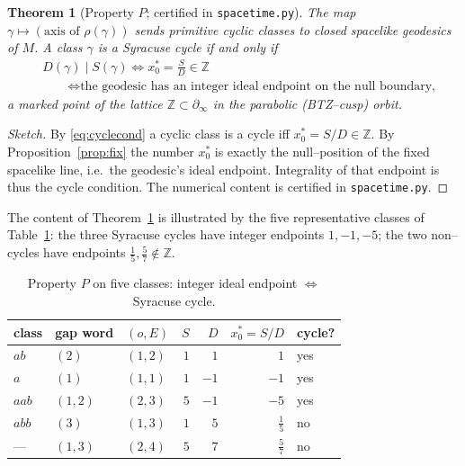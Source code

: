 \documentclass[11pt,a4paper]{article}
\theoremstyle{bourbaki}
\newtheorem{thm}{Theorem}[section]
\theoremstyle{bourbakidef}
\newcommand{\Z}{\mathbb{Z}}
\begin{document}
\begin{thm}[Property $P$; certified in \texttt{spacetime.py}]\label{thm:P}
The map $\gamma\mapsto(\text{axis of }\rho(\gamma))$ sends primitive cyclic classes to
closed spacelike geodesics of $M$. A class $\gamma$ is a \emph{Syracuse cycle} if and only if
\begin{align*}
  & D(\gamma)\mid S(\gamma)\iff x_0^\ast=\tfrac{S}{D}\in\Z\\
  &\qquad\iff \text{the geodesic has an integer ideal endpoint on the null boundary,}
\end{align*}
a marked point of the lattice $\Z\subset\partial_\infty$ in the parabolic (BTZ--cusp) orbit.
\end{thm}

\begin{proof}[Sketch]
By \eqref{eq:cyclecond} a cyclic class is a cycle iff $x_0^\ast=S/D\in\Z$. By
Proposition~\ref{prop:fix} the number $x_0^\ast$ is exactly the null--position of the fixed
spacelike line, i.e.\ the geodesic's ideal endpoint. Integrality of that endpoint is thus the
cycle condition. The numerical content is certified in \texttt{spacetime.py}.
\end{proof}

The content of Theorem~\ref{thm:P} is illustrated by the five representative classes of
Table~\ref{tab:cycles}: the three Syracuse cycles have integer endpoints $1,-1,-5$; the two
non--cycles have endpoints $\tfrac15,\tfrac57\notin\Z$.

\begin{table}[ht]
  \centering
  \begin{tabular}{@{}lllrrrl@{}}
    \toprule
    class & gap word & $(o,E)$ & $S$ & $D$ & $x_0^\ast=S/D$ & cycle?\\
    \midrule
    $ab$    & $(2)$   & $(1,2)$ & $1$ & $1$  & $1$            & yes\\
    $a$     & $(1)$   & $(1,1)$ & $1$ & $-1$ & $-1$           & yes\\
    $aab$   & $(1,2)$ & $(2,3)$ & $5$ & $-1$ & $-5$           & yes\\
    $abb$   & $(3)$   & $(1,3)$ & $1$ & $5$  & $\tfrac15$     & no\\
    ---     & $(1,3)$ & $(2,4)$ & $5$ & $7$  & $\tfrac57$     & no\\
    \bottomrule
  \end{tabular}
  \caption{Property $P$ on five classes: integer ideal endpoint $\iff$ Syracuse cycle.}
  \label{tab:cycles}
\end{table}
\end{document}
